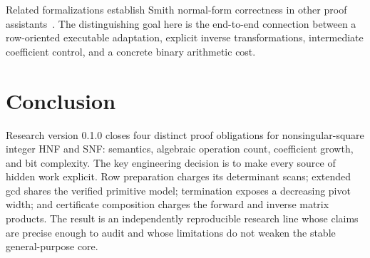 \documentclass[11pt]{article}
\begin{document}
Related formalizations establish Smith normal-form correctness in other proof
assistants~\citep{divasonThiemann2022snf}.  The distinguishing goal here is the
end-to-end connection between a row-oriented executable adaptation, explicit
inverse transformations, intermediate coefficient control, and a concrete
binary arithmetic cost.

\section{Conclusion}

Research version 0.1.0 closes four distinct proof obligations for
nonsingular-square integer HNF and SNF: semantics, algebraic operation count,
coefficient growth, and bit complexity.  The key engineering decision is to
make every source of hidden work explicit.  Row preparation charges its
determinant scans; extended gcd shares the verified primitive model;
termination exposes a decreasing pivot width; and certificate composition
charges the forward and inverse matrix products.  The result is an
independently reproducible research line whose claims are precise enough to
audit and whose limitations do not weaken the stable general-purpose core.



\end{document}
